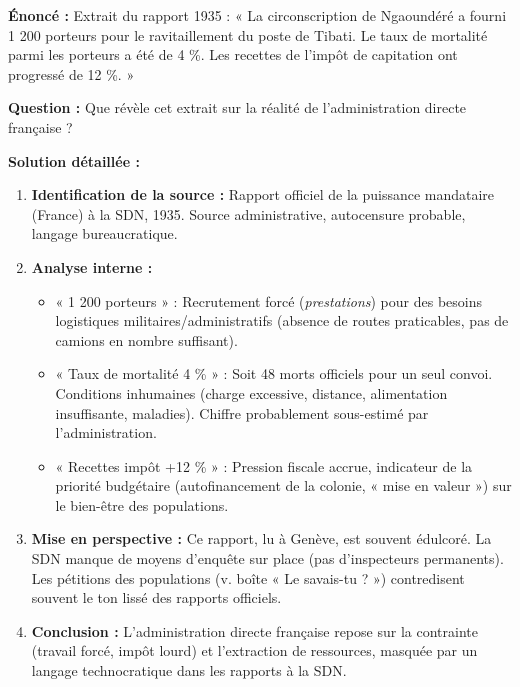 \documentclass[11pt]{article}
\begin{document}
\begin{exoresolu}
\textbf{Énoncé :} Extrait du rapport 1935 : « La circonscription de Ngaoundéré a fourni 1 200 porteurs pour le ravitaillement du poste de Tibati. Le taux de mortalité parmi les porteurs a été de 4 \%. Les recettes de l'impôt de capitation ont progressé de 12 \%. »

\textbf{Question :} Que révèle cet extrait sur la réalité de l'administration directe française ?

\tcblower

\textbf{Solution détaillée :}
\begin{enumerate}
\item \textbf{Identification de la source :} Rapport officiel de la puissance mandataire (France) à la SDN, 1935. Source administrative, autocensure probable, langage bureaucratique.
\item \textbf{Analyse interne :}
\begin{itemize}
\item « 1 200 porteurs » : Recrutement forcé (\emph{prestations}) pour des besoins logistiques militaires/administratifs (absence de routes praticables, pas de camions en nombre suffisant).
\item « Taux de mortalité 4 \% » : Soit 48 morts officiels pour un seul convoi. Conditions inhumaines (charge excessive, distance, alimentation insuffisante, maladies). Chiffre probablement sous-estimé par l'administration.
\item « Recettes impôt +12 \% » : Pression fiscale accrue, indicateur de la priorité budgétaire (autofinancement de la colonie, « mise en valeur ») sur le bien-être des populations.
\end{itemize}
\item \textbf{Mise en perspective :} Ce rapport, lu à Genève, est souvent édulcoré. La SDN manque de moyens d'enquête sur place (pas d'inspecteurs permanents). Les pétitions des populations (v. boîte « Le savais-tu ? ») contredisent souvent le ton lissé des rapports officiels.
\item \textbf{Conclusion :} L'administration directe française repose sur la contrainte (travail forcé, impôt lourd) et l'extraction de ressources, masquée par un langage technocratique dans les rapports à la SDN.
\end{enumerate}
\end{exoresolu}
\end{document}
